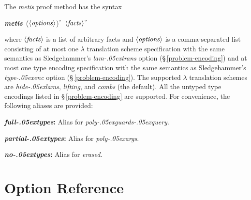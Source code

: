 \documentclass[a4paper,12pt]{article}
\let\oldS=\S
\def\S{\oldS\,}
\def\qty#1{\ensuremath{\left<\mathit{#1\/}\right>}}
\renewcommand\_{\hbox{\textunderscore\kern-.05ex}}
\begin{document}
The \textit{metis} proof method has the syntax

\prew
\textbf{\textit{metis}}~(\qty{options})${}^?$~\qty{facts}${}^?$
\postw

where \qty{facts} is a list of arbitrary facts and \qty{options} is a
comma-separated list consisting of at most one $\lambda$ translation scheme
specification with the same semantics as Sledgehammer's \textit{lam\_trans}
option (\S\ref{problem-encoding}) and at most one type encoding specification
with the same semantics as Sledgehammer's \textit{type\_enc} option
(\S\ref{problem-encoding}).
%
The supported $\lambda$ translation schemes are \textit{hide\_lams},
\textit{lifting}, and \textit{combs} (the default).
%
All the untyped type encodings listed in \S\ref{problem-encoding} are supported.
For convenience, the following aliases are provided:
\begin{enum}
\item[\labelitemi] \textbf{\textit{full\_types}:} Alias for \textit{poly\_guards\_query}.
\item[\labelitemi] \textbf{\textit{partial\_types}:} Alias for \textit{poly\_args}.
\item[\labelitemi] \textbf{\textit{no\_types}:} Alias for \textit{erased}.
\end{enum}


\section{Option Reference}
\label{option-reference}

\def\defl{\{}
\def\defr{\}}
\end{document}
